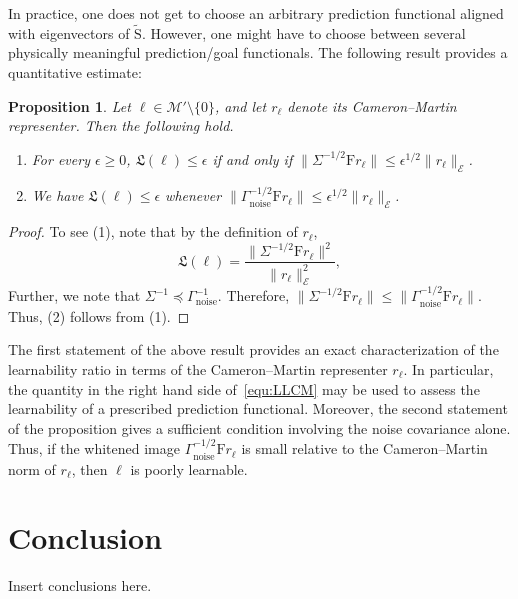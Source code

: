 \documentclass[ba]{imsart}
\theoremstyle{plain}
\newtheorem{proposition}[theorem]{Proposition}
\newcommand{\prcov}{\Gamma_{\mathrm{pr}}}
\newcommand{\noise}{\Gamma_{\mathrm{noise}}}
\newcommand{\F}{\mathrm{F}}
\newcommand{\St}{\widetilde{\mathrm{S}}}
\newcommand{\Gammay}{\Sigma}
\newcommand{\M}{\mathcal{M}}
\newcommand{\LL}{\mathfrak{L}}
\newcommand{\CM}{\mathcal{E}}
\begin{document}
In practice, one does not get to choose an arbitrary prediction 
functional aligned with eigenvectors of $\St$. However, one might 
have to choose between several physically meaningful prediction/goal 
functionals. The following result provides a quantitative estimate:
\begin{proposition}\label{prop:learnability-bound}
Let $\ell\in\M'\setminus\{0\}$, and let $r_\ell$ denote its
Cameron--Martin representer. Then the following hold.
\begin{enumerate}
\item
For every $\epsilon\geq0$,
$\LL(\ell)\leq\epsilon$
if and only if
$\|\Gammay^{-1/2}\F r_\ell\| \leq \epsilon^{1/2}\|r_\ell\|_{\CM}$.
\item
We have $\LL(\ell)\leq\epsilon$ whenever
$\|\noise^{-1/2}\F r_\ell\| \leq \epsilon^{1/2}\|r_\ell\|_{\CM}$.
\end{enumerate}
\end{proposition}
\begin{proof}
To see (1), note that by the definition of $r_\ell$,
\begin{equation}\label{equ:LLCM}
    \LL(\ell)
    =
    \frac{\|\Gammay^{-1/2}\F r_\ell\|^2}{\|r_\ell\|_{\CM}^2},
\end{equation}
Further, we note that $\Gammay^{-1}\preceq\noise^{-1}$.
Therefore,
$\|\Gammay^{-1/2}\F r_\ell\| \leq \|\noise^{-1/2}\F r_\ell\|$.
Thus, (2) follows from (1).
\end{proof}
The first statement of the above result 
provides an exact characterization of the learnability ratio in
terms of the Cameron--Martin representer $r_\ell$. In particular, the quantity
in the right hand side of~\eqref{equ:LLCM}
may be used to assess the learnability
of a prescribed prediction functional. Moreover,  
the second statement of the proposition gives a sufficient condition involving the noise covariance alone.
Thus, if the whitened image $\noise^{-1/2}\F r_\ell$ is small relative
to the Cameron--Martin norm of $r_\ell$, then $\ell$ is poorly learnable.

\section{Conclusion}
Insert conclusions here.
\end{document}
